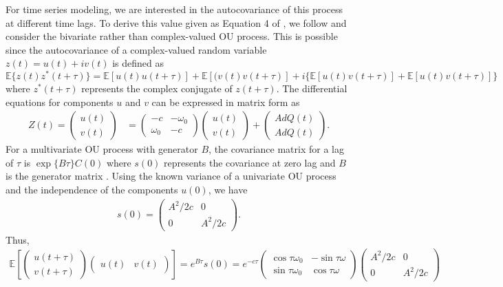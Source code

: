 \documentclass{stat572Style}
\begin{document}
For time series modeling, we are interested in the autocovariance of this process at different time lags. To derive this value given as Equation 4 of \citet{Sykulski2016}, we follow \citet{Arato1999} and consider the bivariate rather than complex-valued OU process.
This is possible since the autocovariance of a complex-valued random variable $z(t) = u(t) + i v(t)$ is defined as 
\begin{equation}
\label{eq: expec}
\mathbb{E}\{z(t) z^{*}(t + \tau)\} = \mathbb{E}[u(t)u(t + \tau)] + \mathbb{E}[(v(t) v(t + \tau)] + i\{\mathbb{E}[u(t) v(t + \tau)] + \mathbb{E}[u(t)v( t + \tau)]\}
\end{equation}
\citep{DeIaco2003} where $z^{*}(t + \tau)$ represents the complex conjugate of $z(t + \tau)$. The differential equations for components $u$ and $v$ can be expressed in matrix form as 
\begin{align}
Z(t) = \left( \begin{array}{c} u(t) \\ v(t) \end{array} \right) &= 
\left( \begin{array}{cc} -c & -\omega_{0} \\ \omega_{0} & -c \end{array} \right) \left( \begin{array}{cc} u(t) \\ v(t) \end{array} \right) + \left( \begin{array}{c} A d Q(t) \\ Ad Q(t) \end{array} \right). 
\end{align}
For a multivariate OU process with generator $B$, the covariance matrix for a lag of $\tau$ is $\exp \{B \tau \}C(0) $ where $s(0)$ represents the covariance at zero lag and $B$ is the generator matrix \citep{Schach1971}. 
Using the known variance of a univariate OU process and the independence of the components $u(0)$, we have
\begin{align}
s(0) = \left( \begin{array}{cc} A^{2}/2c & 0 \\ 0 & A^{2}/2c \end{array} \right).
\end{align}
Thus, 
\begin{align}
\label{eq: covDeriv}
\mathbb{E} \left[\left( \begin{array}{c} u(t + \tau) \\ v(t + \tau)  \end{array} \right) \left( \begin{array}{cc} u(t) & v(t) \end{array} \right)  \right] = e^{B \tau} s(0) = 
e^{-c \tau} \left( \begin{array}{cc} \cos \tau \omega_{0} & - \sin \tau \omega \\ \sin \tau \omega_{0} & \cos \tau \omega  \end{array} \right)  \left( \begin{array}{cc} A^{2}/2c & 0 \\ 0 & A^{2}/2c \end{array} \right)
\end{align}
\end{document}
